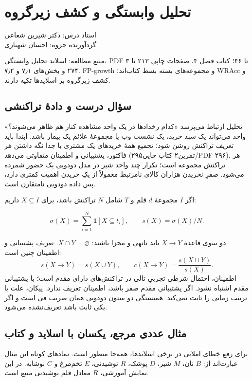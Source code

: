\documentclass[12pt,a4paper,oneside]{report}
\newcommand{\source}[1]{\par{\small\color{muted} منبع مطالعه: #1}\par}
\begin{document}
\setcounter{chapter}{6}
\chapter{تحلیل وابستگی و کشف زیرگروه}
\begin{center}{\small\color{muted} استاد درس: دکتر شیرین شعاعی\\[2mm] گردآورنده جزوه: احسان شهبازی}\end{center}

\source{اسلاید تحلیل وابستگی، PDF ۳ تا ۴۶؛ کتاب فصل ۴، صفحات چاپی ۲۱۳ تا ۲۷۴ و بخش‌های ۷٫۱ و ۷٫۲. FP-growth و مجموعه‌های بسته بسط کتاب‌اند؛ WRAcc و کشف زیرگروه بر اسلایدها تکیه دارند.}
\section{سؤال درست و دادهٔ تراکنشی}

تحلیل ارتباط می‌پرسد «کدام رخدادها در یک واحد مشاهده کنار هم ظاهر می‌شوند؟» واحد می‌تواند یک سبد خرید، یک نشست وب یا مجموعهٔ علائم یک بیمار باشد. ابتدا باید تعریف تراکنش روشن شود؛ تجمیع همهٔ خریدهای یک مشتری با جدا نگه داشتن هر فاکتور، پشتیبانی و اطمینان متفاوتی می‌دهد (تمرین۲ کتاب چاپی۲۹۵/PDF ۲۹۶). هر تراکنش مجموعه است؛ تکرار چند واحد شیر در مدل دودویی یک حضور شمرده می‌شود. صفرِ نخریدن هزاران کالای نامرتبط معمولاً از یکِ خریدن اهمیت کمتری دارد، پس داده دودویی نامتقارن است.

اگر $I$ مجموعهٔ $d$ قلم و $T$ شامل $N$ تراکنش باشد، برای $X\subseteq I$ داریم:

\[\sigma(X)=\sum_{i=1}^{N}\mathbf1[X\subseteq t_i],\qquad s(X)=\sigma(X)/N.\]

دو سوی قاعدهٔ $X\to Y$ باید ناتهی و مجزا باشند: $X\cap Y=\varnothing$. تعریف پشتیبانی و اطمینان چنین است:
\[s(X\to Y)=s(X\cup Y),\qquad c(X\to Y)=\frac{s(X\cup Y)}{s(X)}.\]
اطمینان، احتمال شرطی تجربیِ تالی در تراکنش‌های دارای مقدم است؛ با پشتیبانی مقدم اشتباه نشود. اگر پشتیبانی مقدم صفر باشد، اطمینان تعریف ندارد. پیکان، علت یا ترتیب زمانی را ثابت نمی‌کند. همبستگی دو ستون دودویی همان ضریب فی است و اگر یکی ثابت باشد تعریف‌نشده می‌شود.

\section{مثال عددی مرجع، یکسان با اسلاید و کتاب}

برای رفع خطای املایی  در برخی اسلایدها، همه‌جا  منظور است. نمادهای کوتاه این مثال عبارت‌اند از: $B$ نان، $M$ شیر، $D$ پوشک، $R$ نوشیدنی، $E$ تخم‌مرغ و $C$ نوشابه. در این نمایش آموزشی، $R$ معادل قلم نوشیدنی منبع است.
\end{document}

